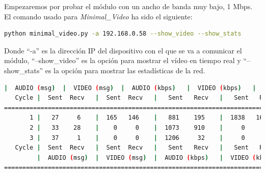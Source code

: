Empezaremos por probar el módulo con un ancho de banda muy bajo, 1 Mbps. El comando usado para \textit{Minimal\_Video} ha sido el siguiente:

\begin{lstlisting}[language=bash]
python minimal_video.py -a 192.168.0.58 --show_video --show_stats
\end{lstlisting}
Donde ``-a'' es la dirección IP del dispositivo con el que se va a comunicar el módulo, ``--show\_video'' es la opción para mostrar el vídeo en tiempo real y ``--show\_stats'' es la opción para mostrar las estadísticas de la red.
\vspace{\baselineskip}

\begin{lstlisting}[language=bash,basicstyle=\ttfamily\tiny]
         |  AUDIO (msg)  |  VIDEO (msg)  |  AUDIO (kbps)   |  VIDEO (kbps)   |     CPU (%) 
   Cycle |  Sent  Recv   |  Sent  Recv   |   Sent   Recv   |   Sent   Recv   | Program System
================================================================================================
       1 |   27     6    |  165   146    |   881    195    |  1838   1628    |  36      0       
       2 |   33    28    |    0     0    |  1073    910    |     0      0    |  41     75       
       3 |   37     1    |    0     0    |  1206     32    |     0      0    |  51     74       
   Cycle |  Sent  Recv   |  Sent  Recv   |   Sent   Recv   |   Sent   Recv   | Program System
         |  AUDIO (msg)  |  VIDEO (msg)  |  AUDIO (kbps)   |  VIDEO (kbps)   |     CPU (%) 
===========================================================================================
\end{lstlisting}


